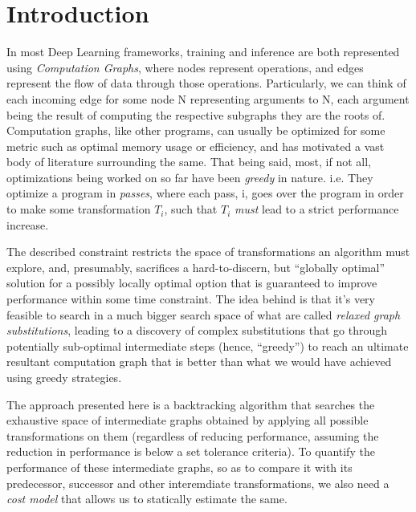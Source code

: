 \documentclass[12pt,a4paper,twoside,openright,bibliography=totocnumbered]{report}
\begin{document}
\titleformat{\section}[hang]
        {\normalfont\normalsize\bfseries}{\thesection}{0.5em}{}

\titleformat{\subsection}[hang]
        {\normalfont\small\bfseries}{\thesubsection}{0.5em}{}


\chapter{Introduction}
In most Deep Learning frameworks, training and inference are both represented using \textit{Computation Graphs}, where nodes represent operations, and edges represent the flow of data through those operations. Particularly, we can think of each incoming edge for some node N representing arguments to N, each argument being the result of computing the respective subgraphs they are the roots of. Computation graphs, like other programs, can usually be optimized for some metric such as optimal memory usage or efficiency, and has motivated a vast body of literature surrounding the same. That being said, most, if not all, optimizations being worked on so far have been \textit{greedy} in nature. i.e. They optimize a program in \textit{passes}, where each pass, i, goes over the program in order to make some transformation $T_i$, such that $T_i$ \textit{must} lead to a strict performance increase. 

The described constraint restricts the space of transformations an algorithm must explore, and, presumably, sacrifices a hard-to-discern, but ``globally optimal'' solution for a possibly locally optimal option that is guaranteed to improve performance within some time constraint. The idea behind \cite{jia2019} is that it's very feasible to search in a much bigger search space of what are called \textit{relaxed graph substitutions}, leading to a discovery of complex substitutions that go through potentially sub-optimal intermediate steps (hence, ``greedy'') to reach an ultimate resultant computation graph that is better than what we would have achieved using greedy strategies.

The approach presented here is a backtracking algorithm that searches the exhaustive space of intermediate graphs obtained by applying all possible transformations on them (regardless of reducing performance, assuming the reduction in performance is below a set tolerance criteria). To quantify the performance of these intermediate graphs, so as to compare it with its predecessor, successor and other interemdiate transformations, we also need a \textit{cost model} that allows us to statically estimate the same.
\end{document}
